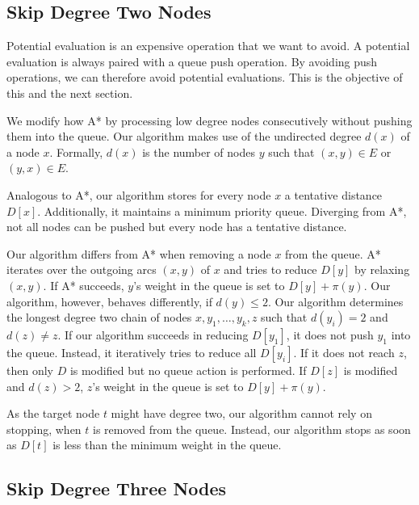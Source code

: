 \documentclass[sigconf]{acmart}
\begin{document}
\subsection{Skip Degree Two Nodes}

Potential evaluation is an expensive operation that we want to avoid.
A potential evaluation is always paired with a queue push operation.
By avoiding push operations, we can therefore avoid potential evaluations.
This is the objective of this and the next section.

We modify how A* by processing low degree nodes consecutively without pushing them into the queue.
Our algorithm makes use of the undirected degree $d(x)$ of a node $x$.
Formally, $d(x)$ is the number of nodes $y$ such that $(x,y)\in E$ or $(y,x)\in E$.

Analogous to A*, our algorithm stores for every node $x$ a tentative distance $D[x]$.
Additionally, it maintains a minimum priority queue.
Diverging from A*, not all nodes can be pushed but every node has a tentative distance.

Our algorithm differs from A* when removing a node $x$ from the queue.
A* iterates over the outgoing arcs $(x,y)$ of $x$ and tries to reduce $D[y]$ by relaxing $(x,y)$.
If A* succeeds, $y$'s weight in the queue is set to $D[y]+\pi(y)$.
Our algorithm, however, behaves differently, if $d(y)\le 2$.
Our algorithm determines the longest degree two chain of nodes $x,y_1,\ldots, y_k, z$ such that $d(y_i)=2$ and $d(z)\neq z$.
If our algorithm succeeds in reducing $D[y_1]$, it does not push $y_1$ into the queue.
Instead, it iteratively tries to reduce all $D[y_i]$.
If it does not reach $z$, then only $D$ is modified but no queue action is performed.
If $D[z]$ is modified and $d(z)>2$, $z$'s weight in the queue is set to $D[y]+\pi(y)$.

As the target node $t$ might have degree two, our algorithm cannot rely on stopping, when $t$ is removed from the queue.
Instead, our algorithm stops as soon as $D[t]$ is less than the minimum weight in the queue.

\subsection{Skip Degree Three Nodes}
\end{document}
